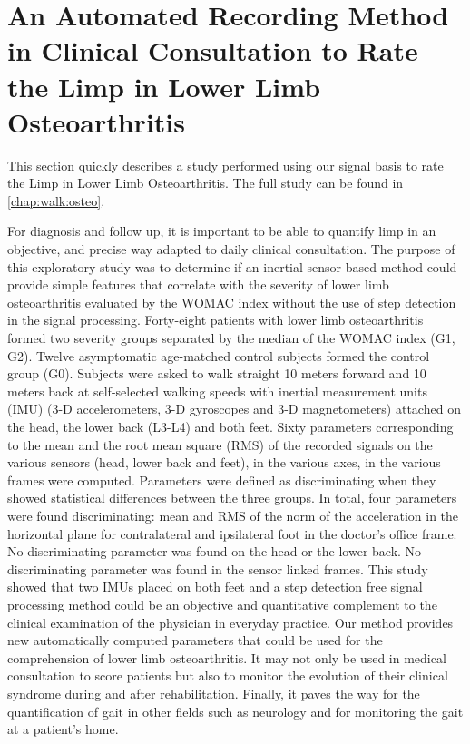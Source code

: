 \documentclass[../thesis.tex]{subfiles}
\begin{document}
\section[Rating the Limp in Lower Limb Osteoarthritis]{%
	An Automated Recording Method in Clinical Consultation to Rate the Limp in Lower Limb Osteoarthritis}
	\label{sec:walk:plos_one}


This section quickly describes a study performed using our signal basis to rate the Limp in Lower Limb Osteoarthritis. The full study can be found in \autoref{chap:walk:osteo}.


For diagnosis and follow up, it is important to be able to quantify limp in an objective, and precise way adapted to daily clinical consultation. The purpose of this exploratory study was to determine if an inertial sensor-based method could provide simple features that correlate with the severity of lower limb osteoarthritis evaluated by the WOMAC index without the use of step detection in the signal processing. Forty-eight patients with lower limb osteoarthritis formed two severity groups separated by the median of the WOMAC index (G1, G2). Twelve asymptomatic age-matched control subjects formed the control group (G0). Subjects were asked to walk straight 10 meters forward and 10 meters back at self-selected walking speeds with inertial measurement units (IMU) (3-D accelerometers, 3-D gyroscopes and 3-D magnetometers) attached on the head, the lower back (L3-L4) and both feet. Sixty parameters corresponding to the mean and the root mean square (RMS) of the recorded signals on the various sensors (head, lower back and feet), in the various axes, in the various frames were computed. Parameters were defined as discriminating when they showed statistical differences between the three groups. In total, four parameters were found discriminating: mean and RMS of the norm of the acceleration in the horizontal plane for contralateral and ipsilateral foot in the doctor’s office frame. No discriminating parameter was found on the head or the lower back. No discriminating parameter was found in the sensor linked frames. This study showed that two IMUs placed on both feet and a step detection free signal processing method could be an objective and quantitative complement to the clinical examination of the physician in everyday practice. Our method provides new automatically computed parameters that could be used for the comprehension of lower limb osteoarthritis. It may not only be used in medical consultation to score patients but also to monitor the evolution of their clinical syndrome during and after rehabilitation. Finally, it paves the way for the quantification of gait in other fields such as neurology and for monitoring the gait at a patient’s home.




\biblio{}
\end{document}
